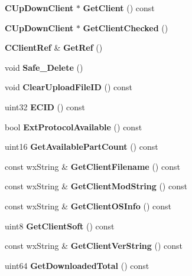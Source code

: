 \begin{DoxyCompactItemize}
\item 
{\bf CUpDownClient} $\ast$ {\bfseries GetClient} () const \label{classCClientRef_a373aef3d92b8b921c668a9fee127f555}

\item 
{\bf CUpDownClient} $\ast$ {\bfseries GetClientChecked} ()\label{classCClientRef_a214da28b5a66d731befd1358d83d39bd}

\item 
{\bf CClientRef} \& {\bfseries GetRef} ()\label{classCClientRef_a33446c5b9450eee837886698996490e1}

\item 
void {\bfseries Safe\_\-Delete} ()\label{classCClientRef_a6cee2fc5ad53aa2a724f605f51d40ee2}

\item 
void {\bfseries ClearUploadFileID} () const \label{classCClientRef_ae9d34af34ea9d82bbcfa8c90df7c94d4}

\item 
uint32 {\bfseries ECID} () const \label{classCClientRef_a6b775d9b4e90b9ad92f9b568821dd04c}

\item 
bool {\bfseries ExtProtocolAvailable} () const \label{classCClientRef_a9ea99981d3237b71b1a5f321a35fe729}

\item 
uint16 {\bfseries GetAvailablePartCount} () const \label{classCClientRef_ae1c4382eed21227fdb41a093f154c0f6}

\item 
const wxString \& {\bfseries GetClientFilename} () const \label{classCClientRef_a679ff4c030fd3334ab87a20df72a5d28}

\item 
const wxString \& {\bfseries GetClientModString} () const \label{classCClientRef_a9bbf785aa7af817c0fed8ca684348354}

\item 
const wxString \& {\bfseries GetClientOSInfo} () const \label{classCClientRef_a7b726d941cd68bf41bec99551f7940f1}

\item 
uint8 {\bfseries GetClientSoft} () const \label{classCClientRef_af71ee15a765d30a8f1d9df434196b3df}

\item 
const wxString \& {\bfseries GetClientVerString} () const \label{classCClientRef_aad9b41392d7ac87912b97e22334b72e7}

\item 
uint64 {\bfseries GetDownloadedTotal} () const \label{classCClientRef_a00323bc5bb6c6ce34e6bb0df14b86eef}


\end{DoxyCompactItemize}
